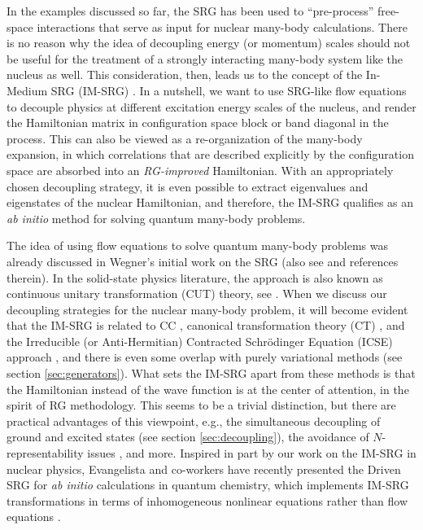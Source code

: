 In the examples discussed so far, the SRG has been used to ``pre-process''
free-space interactions that serve as input for nuclear many-body 
calculations. There is no reason why the idea of decoupling energy 
(or momentum) scales should not be useful for the treatment of a
strongly interacting many-body system like the nucleus as well. This
consideration, then, leads us to the concept of the In-Medium SRG
(IM-SRG) \cite{Tsukiyama:2011uq,Hergert:2013mi,Hergert:2016jk}. In a 
nutshell, we want to use SRG-like flow equations to 
decouple physics at different excitation energy scales of the nucleus, 
and render the Hamiltonian matrix in configuration space block or 
band diagonal in the process. This can also be viewed as a re-organization 
of the many-body expansion, in which correlations that are described 
explicitly by the configuration space are absorbed into an 
\emph{RG-improved} Hamiltonian. With an appropriately chosen decoupling 
strategy, it is even possible to extract eigenvalues and eigenstates
of the nuclear Hamiltonian, and therefore, the IM-SRG qualifies as an 
\emph{ab initio} method for solving quantum many-body problems.


The idea of using flow equations to solve quantum many-body problems
was already discussed in Wegner's initial work on the SRG \cite{Wegner:1994dk} 
(also see \cite{Kehrein:2006kx} and references therein). In the 
solid-state physics literature, the approach is also known as 
continuous unitary transformation (CUT) theory, see  
\cite{Heidbrink:2002kx,Drescher:2011kx,Krull:2012bs,Fauseweh:2013zv,Krones:2015ft}.
When we discuss our decoupling strategies for the nuclear many-body
problem, it will become evident that the IM-SRG is related to CC 
\cite{Shavitt:2009,Hagen:2014ve}, canonical transformation theory (CT) 
\cite{White:2002fk,Yanai:2006uq,Yanai:2007kx}, and the Irreducible (or
Anti-Hermitian) Contracted Schr\"odinger Equation (ICSE) approach 
\cite{Nakatsuji:1976yq,Valdemoro:1987zl,Mukherjee:2001uq,Kutzelnigg:2002kx,
Kutzelnigg:2004vn,Kutzelnigg:2004ys,Mazziotti:2006fk}, and there is
even some overlap with purely variational methods (see section \ref{sec:generators}).
What sets the IM-SRG apart from these methods is that the Hamiltonian 
instead of the wave function is at the center of attention, in the
spirit of RG methodology. This seems to be a trivial distinction, but
there are practical advantages of this viewpoint, e.g., the simultaneous 
decoupling of ground and excited states (see section \ref{sec:decoupling}), 
the avoidance of $N$-representability issues \cite{Mazziotti:2007qe}, and
more. Inspired in part by our work on the IM-SRG in nuclear physics, Evangelista 
and co-workers have recently presented the Driven SRG for \emph{ab initio}
calculations in quantum chemistry, which implements IM-SRG transformations 
in terms of inhomogeneous nonlinear equations rather than flow equations 
\cite{Evangelista:2014rq,Li:2015nq,Li:2016rm,Hannon:2016lp}. 


